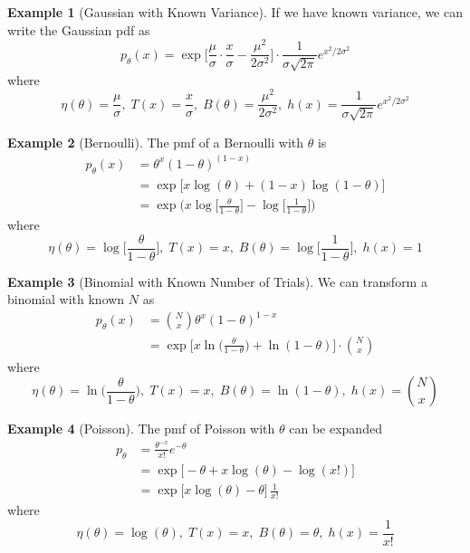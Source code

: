 \documentclass{article}
\theoremstyle{definition}
\newtheorem{example}{Example}[section]
\theoremstyle{remark}
\theoremstyle{definition}
\begin{document}
\begin{example}[Gaussian with Known Variance]
If we have known variance, we can write the Gaussian pdf as 
\[p_\theta (x) = \exp \bigg[ \frac{\mu}{\sigma} \cdot \frac{x}{\sigma} - \frac{\mu^2}{2 \sigma^2} \bigg] \cdot \frac{1}{\sigma \sqrt{2\pi}} e^{x^2/2 \sigma^2}\]
where 
\[\eta(\theta) = \frac{\mu}{\sigma}, \; T(x) = \frac{x}{\sigma}, \; B(\theta) = \frac{\mu^2}{2 \sigma^2}, \; h(x) = \frac{1}{\sigma \sqrt{2 \pi}} e^{x^2/2 \sigma^2}\]
\end{example}

\begin{example}[Bernoulli]
The pmf of a Bernoulli with $\theta$ is 
\begin{align*}
    p_\theta (x) & = \theta^x (1 - \theta)^{(1 - x)} \\
    & = \exp \big[x \log (\theta) + (1 - x)\log(1 - \theta) \big] \\
    & = \exp \bigg( x \log \Big[ \frac{\theta}{1 - \theta} \Big] - \log \Big[ \frac{1}{1 - \theta} \Big] \bigg)
\end{align*}
where 
\[\eta(\theta) = \log \Big[ \frac{\theta}{1 - \theta} \Big], \; T(x) = x, \; B(\theta) = \log \Big[ \frac{1}{1 - \theta} \Big], \; h(x) = 1\]
\end{example}


\begin{example}[Binomial with Known Number of Trials]
We can transform a binomial with known $N$ as 
\begin{align*}
    p_\theta (x) &  = {N \choose x} \theta^x  (1 - \theta)^{1 - x} \\
    & = \exp \bigg[ x \ln \big( \frac{\theta}{1 - \theta} \Big) + \ln(1 - \theta) \bigg] \cdot {N \choose x} 
\end{align*}
where 
\[\eta (\theta) = \ln \big( \frac{\theta}{1 - \theta} \Big), \; T(x) = x, \; B(\theta) = \ln(1 - \theta), \; h(x) = {N \choose x}\]
\end{example}

\begin{example}[Poisson]
The pmf of Poisson with $\theta$ can be expanded 
\begin{align*}
    p_\theta & = \frac{\theta^{-x}}{x!} e^{-\theta} \\
    & = \exp \big[ -\theta + x\log(\theta) - \log(x!) \big] \\
    & = \exp \big[ x \log(\theta) - \theta \big] \, \frac{1}{x!}
\end{align*}
where 
\[\eta(\theta) = \log(\theta), \; T(x) = x, \; B(\theta) = \theta, \; h(x) = \frac{1}{x!}\]
\end{example}
\end{document}
